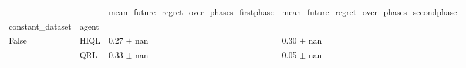 \begin{tabular}{llll}
\toprule
 &  & mean_future_regret_over_phases_firstphase & mean_future_regret_over_phases_secondphase \\
constant_dataset & agent &  &  \\
\midrule
\multirow[t]{2}{*}{False} & HIQL & 0.27 $\pm$ nan & 0.30 $\pm$ nan \\
 & QRL & 0.33 $\pm$ nan & 0.05 $\pm$ nan \\
\cline{1-4}
\bottomrule
\end{tabular}
